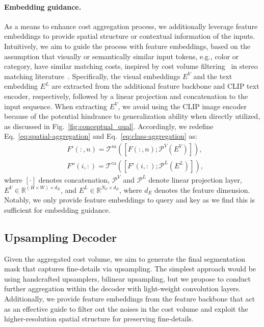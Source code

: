 \documentclass[10pt,twocolumn,letterpaper]{article}
\begin{document}
\vspace{-10pt}
\paragraph{Embedding guidance.}
As a means to enhance cost aggregation process, we additionally leverage feature embeddings to provide spatial structure or contextual information of the inputs. Intuitively, we aim to guide the process with feature embeddings, based on the assumption that visually or semantically similar input tokens, e.g., color or category, have similar matching costs, inspired by cost volume filtering~\cite{hosni2012fast,sun2018pwc} in stereo matching literature~\cite{scharstein2002taxonomy}.
Specifically, the visual embeddings $E^V$ and the text embedding $E^L$ are extracted from the additional feature backbone and CLIP text encoder, respectively, followed by a linear projection and concatenation to the input sequence. When extracting $E^V$, we avoid using the CLIP image encoder because of the potential hindrance to generalization ability when directly utilized, as discussed in Fig.~\ref{fig:conceptual_qual}. Accordingly, we redefine Eq.~\ref{eq:spatial-aggregation} and Eq.~\ref{eq:class-aggregation} as:  
\begin{equation}
\begin{split}
    &{F}'(:, n) = \mathcal{T}^\mathrm{sa}([F(:, n);\mathcal{P}^V(E^V)]),\\
    &{F}''(i,:) = \mathcal{T}^\mathrm{ca}([F'(i,:);\mathcal{P}^L(E^L)]),
\end{split}
\end{equation}
where $[\cdot]$ denotes concatenation, $\mathcal{P}^V$ and $\mathcal{P}^L$ denote linear projection layer, $E^V\in \mathbb{R}^{(H\times W)\times d_E}$, and $E^L\in \mathbb{R}^{N_{\mathcal{C}}\times d_E}$, where $d_E$ denotes the feature dimension. Notably, we only provide  feature embeddings to query and key as we find this is sufficient for embedding guidance. 

\subsection{Upsampling Decoder}
Given the aggregated cost volume, we aim to generate the final segmentation mask that captures fine-details via upsampling. The simplest approach would be using handcrafted upsamplers, \ie bilinear upsampling, but we propose to conduct further aggregation within the
decoder with light-weight convolution layers. Additionally, we provide feature embeddings from the feature backbone 
that act as an effective guide to filter out the noises in the cost volume and exploit the higher-resolution spatial structure for preserving fine-details.
\end{document}
